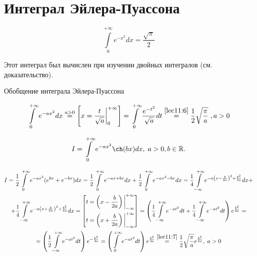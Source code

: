 \documentclass[../../main.tex]{subfiles}
\begin{document}
	\section{Интеграл Эйлера-Пуассона}
	
	\begin{equation}\label{lec11:7}
		\int\limits_0^{+\infty} e^{-x^2} dx = \frac{\sqrt{\pi}}{2}
	\end{equation}
	
	Этот интеграл был вычислен при изучении двойных интегралов (см. 
	доказательство). 
	
	Обобщение интеграла Эйлера-Пуассона
	
	\begin{equation}\label{lec11:8}
		\int\limits_0^{+\infty} e^{-ax^2} dx \overset{a > 0}{=} \left[ x = 
		\frac{t}{\sqrt{a}} \bigg|_0^{+\infty} \right] = \int\limits_0^{+\infty} 
		\frac{e^{-t^2}}{\sqrt{a}} dt \overset{\eqref{lec11:6}}{=} \frac{1}{2} 
		\sqrt{\frac{\pi}{a}} \;, a > 0
	\end{equation}
	
	\begin{exmp}
		\[
		I = \int\limits_0^{+\infty} e^{-ax^2} \ch (bx) dx, 
		\; a > 0, b \in \R
		.\]
		
		\begin{equation*}
			\begin{gathered}
				I = \frac{1}{2} \int\limits_0^{+\infty} e^{-ax^2} (e^{bx} + e^{-bx}) dx = 
				\frac{1}{2} \int\limits_0^{+\infty} e^{-ax + bx} dx + \frac{1}{2} 
				\int\limits_0^{+\infty} e^{-ax^2 - bx} dx = \frac{1}{4} 
				\int\limits_{-\infty}^{+\infty} e^{-a \left( x - \frac{b}{2a} \right)^2 + 
				\frac{b^2}{4a}} dx + \\
				+ \frac{1}{4} \int\limits_{-\infty}^{+\infty} e^{-a \left( x + 
				\frac{b}{2a} \right)^2 + \frac{b^2}{4a}} dx = 
				\left[ 
					\begin{gathered}
						t = \left( x - \frac{b}{2a} \right) \bigg|_{-\infty}^{+\infty} \\
						t = \left( x + \frac{b}{2a} \right) \bigg|_{-\infty}^{+\infty}
					\end{gathered}
				\right] 
				= \left( \frac{1}{4} \int\limits_{-\infty}^{+\infty} e^{-at^2} dt + 
				\frac{1}{4} \int\limits_{-\infty}^{+\infty} e^{-at^2} dt \right) 
				e^{\frac{b^2}{4a}} = \\
				= \left( \frac{1}{2} \int\limits_{-\infty}^{+\infty} e^{-at^2} dt \right) 
				e^{-\frac{b^2}{4a}} = \left( \int\limits_0^{+\infty} e^{-at^2} dt \right) 
				e^{\frac{b^2}{4a}} \overset{\eqref{lec11:7}}{=} \frac{1}{2} 
				\sqrt{\frac{\pi}{a}} e^{\frac{b^2}{4a}}, \; a > 0
			\end{gathered}
		\end{equation*}
	\end{exmp}
\end{document}
